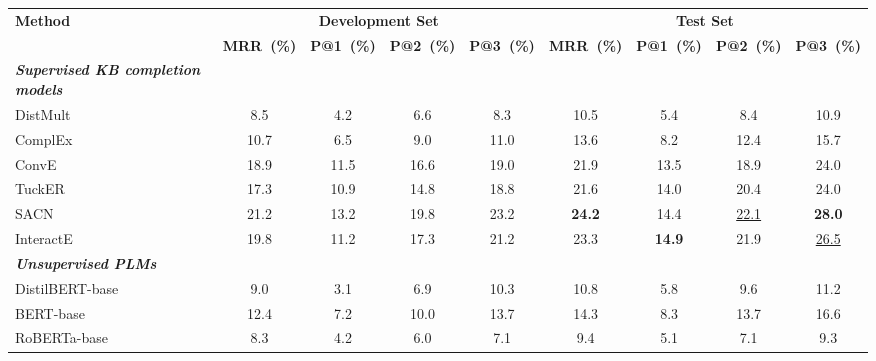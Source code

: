\begin{table}[t!]
	\centering
	\scriptsize
	\begin{tabular}{l|cccc|cccc}
		\toprule
		\multirow{2}{*}{\textbf{Method}} & \multicolumn{4}{c|}{\textbf{Development Set}} &\multicolumn{4}{c}{\textbf{Test Set}}  \\
		
		&\textbf{MRR~(\%)}   &\textbf{P@1~(\%)}  &\textbf{P@2~(\%)}  &\textbf{P@3~(\%)}  &\textbf{MRR~(\%)}   &\textbf{P@1~(\%)}  &\textbf{P@2~(\%)}  &\textbf{P@3~(\%)}  \\
		\cline{1-9}
		\textbf{\textit{Supervised KB completion models}} & & & & & & & &\\
		\cline{1-9}
		DistMult~\citep{yang2015embedding} &8.5   &4.2  &6.6  &8.3  &10.5   &5.4  &8.4  &10.9  \\
		ComplEx~\citep{complex} &10.7   &6.5  &9.0  &11.0  &13.6   &8.2  &12.4  &15.7  \\
		ConvE~\citep{DBLP:journals/corr/DettmersMSR17} &18.9   &11.5  &16.6  &19.0  &21.9   &13.5  &18.9  &24.0  \\
		TuckER~\citep{balavzevic2019tucker} &17.3   &10.9  &14.8  &18.8  &21.6   &14.0  &20.4  &24.0  \\
		SACN~\citep{shang2019end-to-end} &21.2   &13.2  &19.8  &23.2  &\textbf{24.2} &14.4  &\underline{22.1}  &\textbf{28.0}  \\
		InteractE~\citep{interacte2020} &19.8   &11.2  &17.3  &21.2  &23.3   &\textbf{14.9}  &21.9  &\underline{26.5}  \\
		\midrule
		\textbf{\textit{Unsupervised PLMs}} & & & & & & & &\\
		\cline{1-9}
		DistilBERT-base &9.0 &3.1 &6.9 &10.3 &10.8 &5.8 &9.6 &11.2 \\
		BERT-base &12.4 &7.2 &10.0 &13.7 &14.3 &8.3 &13.7 &16.6 \\
		RoBERTa-base &8.3 &4.2 &6.0 &7.1 &9.4 &5.1 &7.1 &9.3 \\

\end{tabular}
\end{table}
